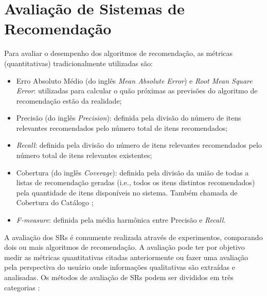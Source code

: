 \section{Avaliação de Sistemas de Recomendação}\label{section:fundamentacao-avaliacao-sr}

Para avaliar o desempenho dos algoritmos de recomendação, as métricas (quantitativas) tradicionalmente utilizadas são:

\begin{itemize}
\item Erro Absoluto Médio (do inglês \textit{Mean Absolute Error}) e \textit{Root Mean Square Error}: utilizadas
para calcular o quão próximas as previsões do algoritmo de recomendação estão da realidade;
\item Precisão (do inglês \textit{Precision}): definida pela divisão do número de itens relevantes recomendados pelo número total de itens recomendados;
\item \textit{Recall}: definida pela divisão do número de itens relevantes recomendados pelo número total de itens
relevantes existentes;
\item Cobertura (do inglês \textit{Coverage}): definida pela divisão da união de todas a listas de recomendação geradas (i.e., todos os itens
distintos recomendados) pela quantidade de itens disponíveis no sistema. Também chamada de Cobertura do Catálogo \cite{ge2010beyond};
\item \textit{F-measure}: definida pela média harmônica entre Precisão e \textit{Recall}.
\end{itemize}

A avaliação dos SRs é comumente realizada através de experimentos, comparando dois ou mais algoritmos de recomendação. A
avaliação pode ter por objetivo medir as métricas quantitativas citadas anteriormente ou fazer uma avaliação pela
perspectiva do usuário onde informações qualitativas são extraídas e analisadas. Os métodos de avaliação de SRs podem ser
divididos em três categorias \cite{shani2011evaluating}:

